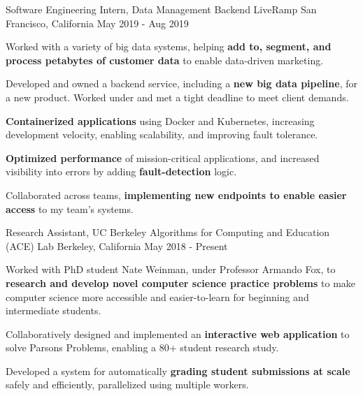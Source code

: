 

\begin{cventries}

    \cventry
      {Software Engineering Intern, Data Management Backend}
      {LiveRamp}
      {San Francisco, California}
      {May 2019 - Aug 2019}
      {
        \begin{cvitems}
          \item Worked with a variety of big data systems, helping \textbf{add to, segment, and process petabytes of customer data} to enable data-driven marketing.
          \item Developed and owned a backend service, including a \textbf{new big data pipeline}, for a new product. Worked under and met a tight deadline to meet client demands.
          \item \textbf{Containerized applications} using Docker and Kubernetes, increasing development velocity, enabling scalability, and improving fault tolerance.         
          \item \textbf{Optimized performance} of mission-critical applications, and increased visibility into errors by adding \textbf{fault-detection} logic.
          \item Collaborated across teams, \textbf{implementing new endpoints to enable easier access} to my team's systems.
        \end{cvitems}
      }

    \cventry
      {Research Assistant, UC Berkeley}
      {Algorithms for Computing and Education (ACE) Lab}
      {Berkeley, California}
      {May 2018 - Present}
      {
        \begin{cvitems}
          \item Worked with PhD student Nate Weinman, under Professor Armando Fox, to \textbf{research and develop novel computer science practice problems}
          to make computer science more accessible and easier-to-learn for beginning and intermediate students.
          \item Collaboratively designed and implemented an \textbf{interactive web application} to solve Parsons Problems, enabling a 80+ student research study. 
          \item Developed a system for automatically \textbf{grading student submissions at scale} safely and efficiently, parallelized using multiple workers.
        \end{cvitems}  
      }

\end{cventries}
